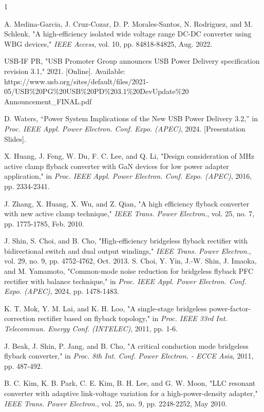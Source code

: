 \documentclass[lettersize,journal]{IEEEtran}
\begin{document}
\begin{thebibliography}{1}


A. Medina-Garcia, J. Cruz-Cozar, D. P. Morales-Santos, N. Rodriguez, and M. Schlenk, "A high-efficiency isolated wide voltage range DC-DC converter using WBG devices," \textit{IEEE Access}, vol. 10, pp. 84818-84825, Aug. 2022.

USB-IF PR, "USB Promoter Group announces USB Power Delivery specification revision 3.1," 2021. [Online]. Available: https://www.usb.org/sites/default/files/2021-05/USB\%20PG\%20USB\%20PD\%203.1\%20DevUpdate\%20\\Announcement\_FINAL.pdf

D. Waters, ``Power System Implications of the New USB Power Delivery 3.2,'' in \textit{Proc. IEEE Appl. Power Electron. Conf. Expo. (APEC)}, 2024. [Presentation Slides].

X. Huang, J. Feng, W. Du, F. C. Lee, and Q. Li, "Design consideration of MHz active clamp flyback converter with GaN devices for low power adapter application," in \textit{Proc. IEEE Appl. Power Electron. Conf. Expo. (APEC)}, 2016, pp. 2334-2341.


J. Zhang, X. Huang, X. Wu, and Z. Qian, "A high efficiency flyback converter with new active clamp technique," \textit{IEEE Trans. Power Electron.}, vol. 25, no. 7, pp. 1775-1785, Feb. 2010.


J. Shin, S. Choi, and B. Cho, "High-efficiency bridgeless flyback rectifier with bidirectional switch and dual output windings," \textit{IEEE Trans. Power Electron.}, vol. 29, no. 9, pp. 4752-4762, Oct. 2013.
{\color{red}
S. Choi, Y. Yin, J.-W. Shin, J. Imaoka, and M. Yamamoto, "Common-mode noise reduction for bridgeless flyback PFC rectifier with balance technique," in \textit{Proc. IEEE Appl. Power Electron. Conf. Expo. (APEC)}, 2024, pp. 1478-1483.}

K. T. Mok, Y. M. Lai, and K. H. Loo, "A single-stage bridgeless power-factor-correction rectifier based on flyback topology," in \textit{Proc. IEEE 33rd Int. Telecommun. Energy Conf. (INTELEC)}, 2011, pp. 1-6.

J. Beak, J. Shin, P. Jang, and B. Cho, "A critical conduction mode bridgeless flyback converter," in \textit{Proc. 8th Int. Conf. Power Electron. - ECCE Asia}, 2011, pp. 487-492.

B. C. Kim, K. B. Park, C. E. Kim, B. H. Lee, and G. W. Moon, "LLC resonant converter with adaptive link-voltage variation for a high-power-density adapter," \textit{IEEE Trans. Power Electron.}, vol. 25, no. 9, pp. 2248-2252, May 2010.


\end{thebibliography}
\end{document}
